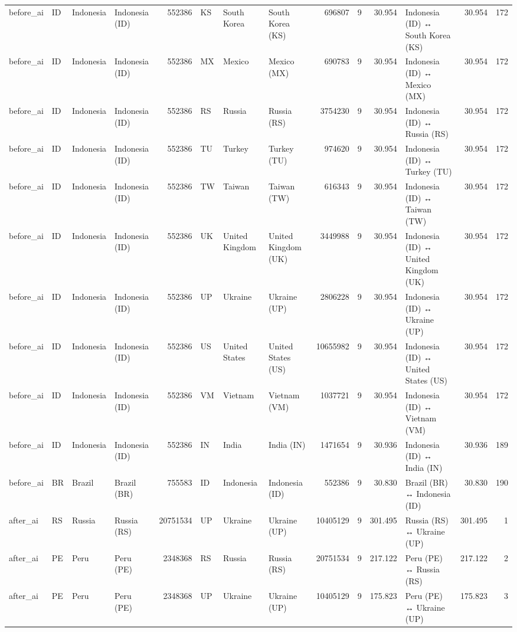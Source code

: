 \begin{tabular}{llllrlllrrrlrr}
before\_ai & ID & Indonesia & Indonesia (ID) & 552386 & KS & South Korea & South Korea (KS) & 696807 & 9 & 30.954 & Indonesia (ID) ↔ South Korea (KS) & 30.954 & 172 \\
before\_ai & ID & Indonesia & Indonesia (ID) & 552386 & MX & Mexico & Mexico (MX) & 690783 & 9 & 30.954 & Indonesia (ID) ↔ Mexico (MX) & 30.954 & 172 \\
before\_ai & ID & Indonesia & Indonesia (ID) & 552386 & RS & Russia & Russia (RS) & 3754230 & 9 & 30.954 & Indonesia (ID) ↔ Russia (RS) & 30.954 & 172 \\
before\_ai & ID & Indonesia & Indonesia (ID) & 552386 & TU & Turkey & Turkey (TU) & 974620 & 9 & 30.954 & Indonesia (ID) ↔ Turkey (TU) & 30.954 & 172 \\
before\_ai & ID & Indonesia & Indonesia (ID) & 552386 & TW & Taiwan & Taiwan (TW) & 616343 & 9 & 30.954 & Indonesia (ID) ↔ Taiwan (TW) & 30.954 & 172 \\
before\_ai & ID & Indonesia & Indonesia (ID) & 552386 & UK & United Kingdom & United Kingdom (UK) & 3449988 & 9 & 30.954 & Indonesia (ID) ↔ United Kingdom (UK) & 30.954 & 172 \\
before\_ai & ID & Indonesia & Indonesia (ID) & 552386 & UP & Ukraine & Ukraine (UP) & 2806228 & 9 & 30.954 & Indonesia (ID) ↔ Ukraine (UP) & 30.954 & 172 \\
before\_ai & ID & Indonesia & Indonesia (ID) & 552386 & US & United States & United States (US) & 10655982 & 9 & 30.954 & Indonesia (ID) ↔ United States (US) & 30.954 & 172 \\
before\_ai & ID & Indonesia & Indonesia (ID) & 552386 & VM & Vietnam & Vietnam (VM) & 1037721 & 9 & 30.954 & Indonesia (ID) ↔ Vietnam (VM) & 30.954 & 172 \\
before\_ai & ID & Indonesia & Indonesia (ID) & 552386 & IN & India & India (IN) & 1471654 & 9 & 30.936 & Indonesia (ID) ↔ India (IN) & 30.936 & 189 \\
before\_ai & BR & Brazil & Brazil (BR) & 755583 & ID & Indonesia & Indonesia (ID) & 552386 & 9 & 30.830 & Brazil (BR) ↔ Indonesia (ID) & 30.830 & 190 \\
after\_ai & RS & Russia & Russia (RS) & 20751534 & UP & Ukraine & Ukraine (UP) & 10405129 & 9 & 301.495 & Russia (RS) ↔ Ukraine (UP) & 301.495 & 1 \\
after\_ai & PE & Peru & Peru (PE) & 2348368 & RS & Russia & Russia (RS) & 20751534 & 9 & 217.122 & Peru (PE) ↔ Russia (RS) & 217.122 & 2 \\
after\_ai & PE & Peru & Peru (PE) & 2348368 & UP & Ukraine & Ukraine (UP) & 10405129 & 9 & 175.823 & Peru (PE) ↔ Ukraine (UP) & 175.823 & 3 \\

\end{tabular}
